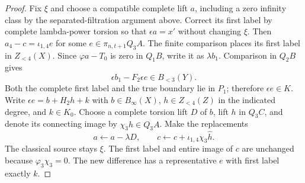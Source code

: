 \begin{proof}
Fix $\xi$ and choose a compatible complete lift $a$, including a zero
infinity class by the separated-filtration argument above. Correct its first
label by complete lambda-power torsion so that $\epsilon a=x'$ without
changing $\xi$. Then $a_4-c=\iota_{1,4}e$ for some
$e\in\pi_{n,t+1}Q_3A$. The finite comparison places its first label in
$Z_{<4}(X)$.
Since $\varphi a-T_0$ is zero in $Q_1B$, write it as $\lambda b_1$.
Comparison in $Q_2B$ gives
\[
 \epsilon b_1-F_2\epsilon e\in B_{<3}(Y).
\]
Both the complete first label and the true boundary lie in $P_1$;
therefore $\epsilon e\in K$. Write $\epsilon e=b+H_2h+k$ with
$b\in B_\infty(X)$, $h\in Z_{<4}(Z)$ in the indicated degree, and
$k\in K_0$. Choose a complete torsion lift $D$ of $b$, lift $h$ in
$Q_3C$, and denote its connecting image by $\chi_3\widehat h\in Q_3A$.
Make the replacements
\[
 a\longleftarrow a-\lambda D,\qquad
 c\longleftarrow c+\iota_{1,4}\chi_3\widehat h.
\]
The classical source stays $\xi$. The first label and entire image of
$c$ are unchanged because $\varphi_3\chi_3=0$.
The new difference has a representative $e$ with first label exactly $k$.


\end{proof}
